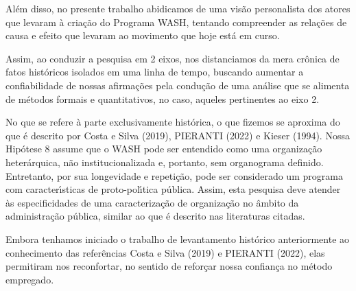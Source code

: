 \documentclass[
12pt,		%
openright,	%
twoside,  %
a4paper,			%
chapter=TITLE,		%
english,			%
french,				%
spanish,			%
brazil				%
]{USPSC-classe/USPSC}
\begin{document}
Al\'em disso, no presente trabalho abidicamos de uma vis\~ao personalista dos atores que levaram \`a cria\c{c}\~ao do Programa WASH, tentando compreender as rela\c{c}\~oes de causa e efeito que levaram ao movimento que hoje est\'a em curso.

















Assim, ao conduzir a pesquisa em 2 eixos, nos distanciamos da mera cr\^onica de fatos hist\'oricos isolados em uma linha de tempo, buscando aumentar a confiabilidade de nossas afirma\c{c}\~oes pela condu\c{c}\~ao de uma an\'alise que se alimenta de m\'etodos formais e quantitativos, no caso, aqueles pertinentes ao eixo 2.

















No que se refere \`a parte exclusivamente hist\'orica, o que fizemos se aproxima do que \'e descrito por   Costa e Silva (2019), PIERANTI (2022) e  Kieser (1994). Nossa Hip\'otese 8 assume que o WASH pode ser entendido como uma organiza\c{c}\~ao heter\'arquica, n\~ao institucionalizada e, portanto, sem organograma definido. Entretanto, por sua longevidade e repeti\c{c}\~ao, pode ser considerado um programa com caracter\'{\i}sticas de proto-pol\'{\i}tica p\'ublica. Assim, esta pesquisa deve atender \`as especificidades de uma caracteriza\c{c}\~ao de organiza\c{c}\~ao no \^ambito da administra\c{c}\~ao p\'ublica, similar ao que \'e descrito nas literaturas citadas.

















Embora tenhamos iniciado o trabalho de levantamento hist\'orico anteriormente ao conhecimento das refer\^encias  Costa e Silva (2019) e  PIERANTI (2022), elas permitiram nos reconfortar, no sentido de refor\c{c}ar nossa confian\c{c}a no m\'etodo empregado.
\end{document}

